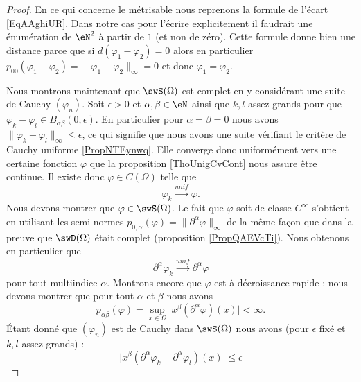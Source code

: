\begin{proof}
    En ce qui concerne le métrisable nous reprenons la formule de l'écart \eqref{EqAAghiUR}. Dans notre cas pour l'écrire explicitement il faudrait une énumération de \( \eN^2\) à partir de \( 1\) (et non de zéro). Cette formule donne bien une distance parce que si \( d(\varphi_1-\varphi_2)=0\) alors en particulier \( p_{00}(\varphi_1-\varphi_2)=\| \varphi_1-\varphi_2 \|_{\infty}=0\) et donc \( \varphi_1=\varphi_2\). 

    Nous montrons maintenant que \( \swS(\Omega)\) est complet en y considérant une suite de Cauchy \( (\varphi_n)\). Soit \( \epsilon>0\) et \( \alpha,\beta\in \eN\) ainsi que \( k,l\) assez grands pour que \( \varphi_k-\varphi_l\in B_{\alpha\beta}(0,\epsilon)\). En particulier pour \( \alpha=\beta=0\) nous avons \( \| \varphi_k-\varphi_l \|_{\infty}\leq \epsilon\), ce qui signifie que nous avons une suite vérifiant le critère de Cauchy uniforme \ref{PropNTEynwq}. Elle converge donc uniformément vers une certaine fonction \( \varphi\) que la proposition \ref{ThoUnigCvCont} nous assure être continue. Il existe donc \( \varphi\in C(\Omega)\) telle que
    \begin{equation}
        \varphi_k\stackrel{unif}{\longrightarrow}\varphi.
    \end{equation}
    Nous devons montrer que \( \varphi\in\swS(\Omega)\). Le fait que \( \varphi\) soit de classe \(  C^{\infty}\) s'obtient en utilisant les semi-normes \( p_{0,\alpha}(\varphi)=\| \partial^{\alpha}\varphi \|_{\infty}\) de la même façon que dans la preuve que \( \swD(\Omega)\) était complet (proposition \ref{PropQAEVcTi}). Nous obtenons en particulier que
    \begin{equation}    \label{EqSZyYkqk}
        \partial^{\alpha}\varphi_k\stackrel{unif}{\longrightarrow}\partial^{\alpha}\varphi
    \end{equation}
    pour tout multiindice \( \alpha\). Montrons encore que \( \varphi\) est à décroissance rapide : nous devons montrer que pour tout \( \alpha\) et \( \beta\) nous avons
    \begin{equation}
        p_{\alpha\beta}(\varphi)=\sup_{x\in \Omega}\big| x^{\beta}(\partial^{\alpha}\varphi)(x) \big|<\infty.
    \end{equation}
    Étant donné que \( (\varphi_n)\) est de Cauchy dans \( \swS(\Omega)\) nous avons (pour \( \epsilon\) fixé et \( k,l\) assez grands) :
    \begin{equation}
        \big| x^{\beta}(\partial^{\alpha}\varphi_k-\partial^{\alpha}\varphi_l)(x) \big|\leq \epsilon

\end{equation}
\end{proof}
